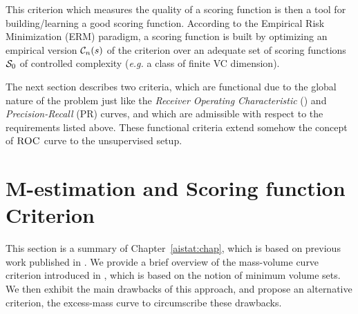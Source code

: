 This criterion which measures the quality of a scoring function is then a tool for building/learning a good scoring function.
According to the Empirical Risk Minimization (ERM) paradigm, a scoring function is built by optimizing  an empirical version $\crit_n(s)$ of the criterion over an adequate set of scoring functions $\S_0$ of controlled complexity (\textit{e.g.} a class of finite {\sc VC} dimension). %

The next section describes two criteria, which are functional due to the global nature of the problem just like the \emph{Receiver Operating Characteristic} (\roc) and \emph{Precision-Recall} (PR) curves, and which are admissible with respect to the requirements listed above. These functional criteria extend somehow the concept of $\roc$ curve to the unsupervised setup.

\section{M-estimation and Scoring function Criterion}
\label{resume:scoring}

This section is a summary of Chapter~\ref{aistat:chap}, which is based on previous work published in \cite{AISTAT15}. We provide a brief overview of the mass-volume curve criterion introduced in \cite{CLEM13}, which is based on the notion of minimum volume sets. We then exhibit the main drawbacks of this approach, and propose an alternative criterion, the excess-mass curve to circumscribe these drawbacks. 

